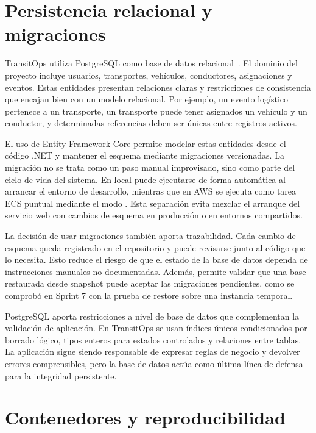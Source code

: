 \section{Persistencia relacional y migraciones}
\label{sec:marco-persistencia}

TransitOps utiliza PostgreSQL como base de datos relacional~\cite{PostgreSqlDocs}. El dominio del proyecto incluye usuarios, transportes, vehículos, conductores, asignaciones y eventos. Estas entidades presentan relaciones claras y restricciones de consistencia que encajan bien con un modelo relacional. Por ejemplo, un evento logístico pertenece a un transporte, un transporte puede tener asignados un vehículo y un conductor, y determinadas referencias deben ser únicas entre registros activos.

El uso de Entity Framework Core permite modelar estas entidades desde el código .NET y mantener el esquema mediante migraciones versionadas. La migración no se trata como un paso manual improvisado, sino como parte del ciclo de vida del sistema. En local puede ejecutarse de forma automática al arrancar el entorno de desarrollo, mientras que en AWS se ejecuta como tarea ECS puntual mediante el modo . Esta separación evita mezclar el arranque del servicio web con cambios de esquema en producción o en entornos compartidos.

La decisión de usar migraciones también aporta trazabilidad. Cada cambio de esquema queda registrado en el repositorio y puede revisarse junto al código que lo necesita. Esto reduce el riesgo de que el estado de la base de datos dependa de instrucciones manuales no documentadas. Además, permite validar que una base restaurada desde snapshot puede aceptar las migraciones pendientes, como se comprobó en Sprint 7 con la prueba de restore sobre una instancia temporal.

PostgreSQL aporta restricciones a nivel de base de datos que complementan la validación de aplicación. En TransitOps se usan índices únicos condicionados por borrado lógico, tipos enteros para estados controlados y relaciones entre tablas. La aplicación sigue siendo responsable de expresar reglas de negocio y devolver errores comprensibles, pero la base de datos actúa como última línea de defensa para la integridad persistente.

\section{Contenedores y reproducibilidad}
\label{sec:marco-contenedores}

